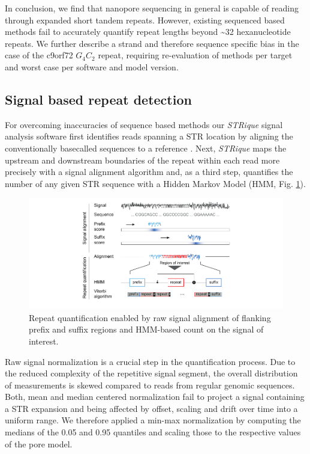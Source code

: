 In conclusion, we find that nanopore sequencing in general is capable of reading through expanded short tandem repeats. However, existing sequenced based methods fail to accurately quantify repeat lengths beyond \textasciitilde32 hexanucleotide repeats. We further describe a strand and therefore sequence specific bias in the case of the c9orf72 $ G_{4}C_{2} $ repeat, requiring re-evaluation of methods per target and worst case per software and model version.




\subsection{Signal based repeat detection}
\label{subsec:strique:sig_repeat_counts}

For overcoming inaccuracies of sequence based methods our \textit{STRique} signal analysis software first identifies reads spanning a STR location by aligning the conventionally basecalled sequences to a reference \cite{Li2018}. Next, \textit{STRique} maps the upstream and downstream boundaries of the repeat within each read more precisely with a signal alignment algorithm and, as a third step, quantifies the number of any given STR sequence with a Hidden Markov Model (HMM, Fig. \ref{fig:strique:count_structure_plasmid}). 

\begin{figure}[h]
	\centering
	\includegraphics[width=1.0\textwidth]{figures/strique/count_structure_plasmid.pdf}
	\captionsetup{format=plain}
	\caption[\textit{STRique}: generic repeat detection pipeline on raw nanopore signals]{Repeat quantification enabled by raw signal alignment of flanking prefix and suffix regions and HMM-based count on the signal of interest.}
	\label{fig:strique:count_structure_plasmid}
\end{figure}

Raw signal normalization is a crucial step in the quantification process. Due to the reduced complexity of the repetitive signal segment, the overall distribution of measurements is skewed compared to reads from regular genomic sequences. Both, mean and median centered normalization fail to project a signal containing a STR expansion and being affected by offset, scaling and drift over time into a uniform range. 
We therefore applied a min-max normalization by computing the medians of the 0.05 and 0.95 quantiles and scaling those to the respective values of the pore model.



